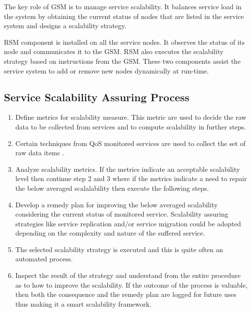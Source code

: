 The key role of GSM is to manage service scalability. It balances service load in the system by obtaining the current status of nodes that are listed in the service system and designs a scalability strategy.

RSM component is installed on all the service nodes. It observes the status of its node and communicates it to the GSM. RSM also executes the scalability strategy based on instructions from the GSM. These two components assist the service system to add or remove new nodes dynamically at run-time.

\subsection{Service Scalability Assuring Process}


\begin{enumerate}
	

\item Define metrics for scalability measure. This metric are used to decide the raw data to be collected from services and to compute scalability in further steps.

\item Certain techniques from QoS monitored services are used to collect the set of raw data items \cite{Artaiam2008EnhancingSQ} \cite{hutchison_monitoring_2007}.

\item Analyze scalability metrics. If the metrics indicate an acceptable scalability level then continue step 2 and 3 where if the metrics indicate a need to repair the below averaged scalalability then execute the following steps. 

\item Develop a remedy plan for improving the below averaged scalability considering the current status of monitored service. Scalability assuring strategies like service replication and/or service migration could be adopted depending on the complexity and nature of the suffered service. 

\item The selected scalability strategy is executed and this is quite often an automated process. 

\item Inspect the result of the strategy and understand from the entire procedure as to how to improve the scalability. If the outcome of the process is valuable, then both the consequence and the remedy plan are logged for future uses thus making it a smart scalability framework.



\end{enumerate}
